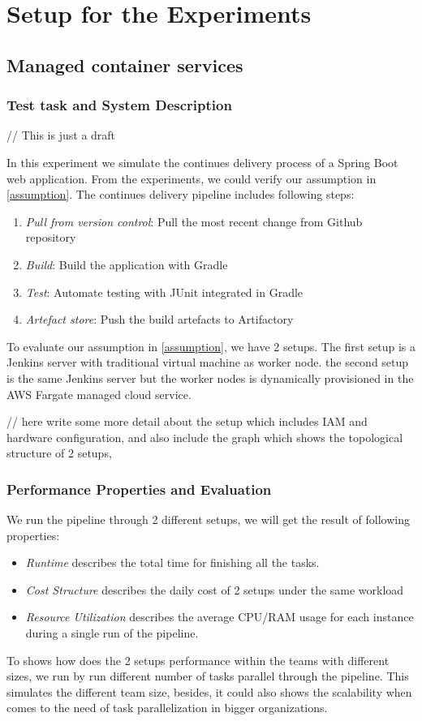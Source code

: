 \section{Setup for the Experiments}
\subsection{Managed container services}
\subsubsection{Test task and System Description}
// This is just a draft

In this experiment we simulate the continues delivery process of a Spring Boot web application. From the experiments, we could verify our assumption in \ref{assumption}.
The continues delivery pipeline includes following steps:
\begin{enumerate}
    \item \textit{Pull from version control}: Pull the most recent change from Github repository
    \item \textit{Build}: Build the application with Gradle
    \item \textit{Test}: Automate testing with JUnit integrated in Gradle
    \item \textit{Artefact store}: Push the build artefacts to Artifactory
\end{enumerate}
To evaluate our assumption in \ref{assumption}, we have 2 setups. The first setup is a Jenkins server with traditional virtual machine as worker node. the second setup is the same Jenkins server but the worker nodes is dynamically provisioned in the AWS Fargate managed cloud service.

// here write some more detail about the setup which includes IAM and hardware configuration, and also include the graph which shows the topological structure of 2 setups,

\subsubsection{Performance Properties and Evaluation}
We run the pipeline through 2 different setups, we will get the result of following properties:
\begin{itemize}
    \item \textit{Runtime} describes the total time for finishing all the tasks.
    \item \textit{Cost Structure} describes the daily cost of 2 setups under the same workload
    \item \textit{Resource Utilization} describes the average CPU/RAM usage for each instance during a single run of the pipeline.
\end{itemize}
To shows how does the 2 setups performance within the teams with different sizes, we run by run different number of tasks parallel through the pipeline. This simulates the different team size, besides, it could also shows the scalability when comes to the need of task parallelization in bigger organizations.

